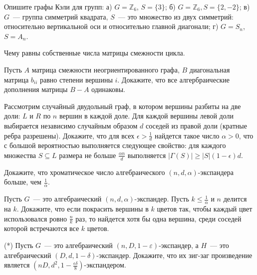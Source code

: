 \setcounter{curtask}{12}



\begin{task}
    Опишите графы Кэли для групп: а) $G = \mathbb{Z}_6$, $S = \{3\}$; 
	б) $G = \mathbb{Z}_6, S = \{2, -2\}$; в) $G$~--- группа  
	симметрий квадрата, $S$~--- это множество из двух симметрий: относительно вертикальной оси
	и относительно главной диагонали; г) $G = S_n$, $S = A_n$.
\end{task}

\begin{task}
    Чему равны собственные числа матрицы смежности цикла.
\end{task}

\begin{task}
    Пусть $A$ матрица смежности неогриентированного графа, $B$ диагональная матрица
    $b_{ii}$ равно степени вершины $i$. Докажите, что все алгербраические дополнения
    матрицы $B - A$ одинаковы.
\end{task}


\breakline

\begin{ptask}{5}
    Рассмотрим случайный двудольный граф, в котором вершины разбиты на две доли: $L$
	и $R$ по $n$ вершин в каждой доле. Для каждой вершины левой доли выбирается
	независимо случайным образом $d$ соседей из правой доли (кратные ребра
	разрешены). Докажите, что для всех $\epsilon > \frac{1}{d}$ найдется такое число
	$\alpha>0$, что с большой вероятностью выполняется следующее свойство: для
    каждого множества $S \subseteq L$ размера не больше $\frac{\alpha n}{d}$
    выполняется $|\Gamma(S)| \ge |S|(1 - \epsilon)d$.
\end{ptask}

\begin{ptask}{6}
    Докажите, что хроматическое число алгебраического $(n,d,\alpha)$-экспандера
    больше, чем $\frac{1}{\alpha}$.
\end{ptask}

\begin{ptask}{7}
    Пусть $G$~--- это алгебраический $(n,d,\alpha)$-экспандер. Пусть 
	$k\le \frac{1}{\alpha}$ и $n$ делится на $k$. Докажите, что если покрасить
    вершины  в $k$ цветов так, чтобы каждый цвет использовался ровно $\frac{n}{k}$
	раз, то найдется хотя бы одна вершина, среди соседей которой встречаются все $k$
    цветов.
\end{ptask}


\begin{ptask}{9}(*)
	Пусть $G$~--- это алгебраический $(n,D, 1-\varepsilon)$-экспандер, а $H$~--- это
    алгебраический $(D, d, 1-\delta)$-экспандер. Докажите, что их зиг-заг
    произведение является $(nD, d^2, 1 - \frac{\epsilon \delta}{8})$-экспандером.
\end{ptask}

